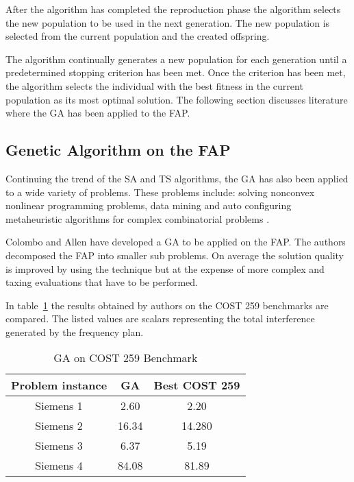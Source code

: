 After the algorithm has completed the reproduction phase the algorithm selects the new population to be used in the next generation. The new population is selected from the current population and the created offspring.

The algorithm continually generates a new population for each generation until a predetermined stopping criterion has been met. Once the criterion has been met, the algorithm selects the individual with the best fitness in the current population as its most optimal solution. The following section discusses literature where the \gls{GA} has been applied to the \gls{FAP}.

\subsection{Genetic Algorithm on the \gls{FAP}}
Continuing the trend of the \gls{SA} and \gls{TS} algorithms, the \gls{GA} has also been applied to a wide variety of problems. These problems include: solving nonconvex nonlinear programming problems\cite{GANonConvex}, data mining \cite{SelfAdaptiveDataMiningGA} and auto configuring metaheuristic algorithms for complex combinatorial problems \cite{AutoComplexMeta}.

Colombo and Allen\cite{ProblemDecompMIFAP} have developed a \gls{GA} to be applied on the \gls{FAP}. The authors decomposed the \gls{FAP} into smaller sub problems. On average the solution quality is improved by using the technique but at the expense of more complex and taxing evaluations that have to be performed\cite{ProblemDecompMIFAP}. 

In table~\ref{tab:GA} the results obtained by authors on the \gls{COST} 259 benchmarks are compared. The listed values are scalars representing the total interference generated by the frequency plan.
\begin{table}[H]
\centering
	\begin{tabular}{| c | c | c |}
	\hline
	Problem instance & \gls{GA} & Best \gls{COST} 259 \\ \hline
	Siemens 1 & 2.60 & 2.20 \\ \hline
	Siemens 2 & 16.34 & 14.280 \\ \hline
	Siemens 3 & 6.37 & 5.19 \\ \hline
	Siemens 4 & 84.08 & 81.89 \\ \hline
	\end{tabular}
\caption{GA on \gls{COST} 259 Benchmark}
\label{tab:GA}
\end{table}

